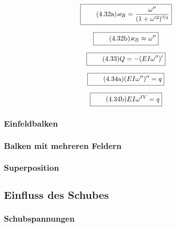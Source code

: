 \documentclass[11pt]{article}
\newcommand{\1}{ {\mathds{1}} }
\begin{document}
		\begin{equation}
			\boxed{
				\tag{4.32a}
				\begin{split}
					\varkappa_B = \frac{\omega''}{(1 + \omega'^2)^{\nicefrac{3}{2}} }
				\end{split}
			}
		\end{equation}

		\begin{equation}
			\boxed{
				\tag{4.32b}
				\begin{split}
					\varkappa_B\approx \omega''
				\end{split}
			}
		\end{equation}
		
		\begin{equation}
			\boxed{
				\tag{4.33}
				\begin{split}
					Q = -(E I \omega'')'
				\end{split}
			}
		\end{equation}

		\begin{equation}
			\boxed{
				\tag{4.34a}
				\begin{split}
					(E I \omega'')'' = q
				\end{split}
			}
		\end{equation}

		\begin{equation}
			\boxed{
				\tag{4.34b}
				\begin{split}
					EI \omega^{I V} = q
				\end{split}
			}
		\end{equation}
		
		\subsubsection{Einfeldbalken} 
		\subsubsection{Balken mit mehreren Feldern}
		\subsubsection{Superposition}
		\subsection{Einfluss des Schubes}
		\subsubsection{Schubspannungen}
\end{document}
